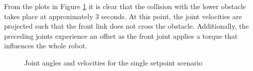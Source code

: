 From the plots in Figure \ref{fig:case2-1-plot} it is clear that the collision with the lower obstacle takes place at approximately 3 seconds. At this point, the joint velocities are projected such that the front link does not cross the obstacle. Additionally, the preceding joints experience an offset as the front joint applies a torque that influences the whole robot.

\begin{figure}[H]
    \centering
    


    \caption{Joint angles and velocities for the single setpoint scenario}
    \label{fig:case2-1-plot}
\end{figure}

